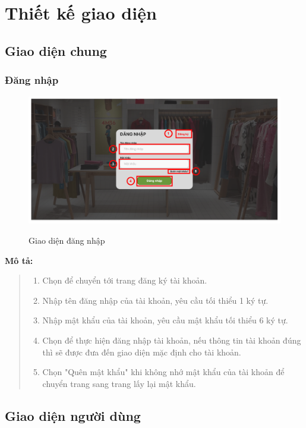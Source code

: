 \section{Thiết kế giao diện}

\subsection{Giao diện chung}
\subsubsection{Đăng nhập}
\begin{figure}[!htp]
    \centering
    \includegraphics[width=5in]{img/UI/customer/login.png}
    \label{1}
    \newline
    \caption{Giao diện đăng nhập}
\end{figure}
\textbf{Mô tả:}
\begin{quote}
    \begin{enumerate}
        \item Chọn để chuyển tới trang đăng ký tài khoản.
        \item Nhập tên đăng nhập của tài khoản, yêu cầu tối thiểu 1 ký tự.
        \item Nhập mật khẩu của tài khoản, yêu cầu mật khẩu tối thiểu 6 ký tự.
        \item Chọn để thực hiện đăng nhập tài khoản, nếu thông tin tài khoản đúng thì sẽ được đưa đến giao diện mặc định cho tài khoản.
        \item Chọn "Quên mật khẩu" khi không nhớ mật khẩu của tài khoản để chuyển trang sang trang lấy lại mật khẩu.
    \end{enumerate}
\end{quote}


\subsection{Giao diện người dùng}
